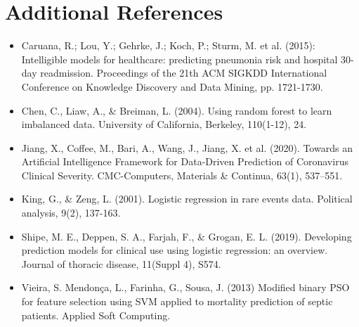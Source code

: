 \documentclass[hidelinks,10pt]{article}
\begin{document}
	\section{Additional References}\label{sec_ref}
	\begin{itemize}
		\item Caruana, R.; Lou, Y.; Gehrke, J.; Koch, P.; Sturm, M. et al. (2015): Intelligible models for healthcare: predicting pneumonia risk and hospital 30-day readmission. Proceedings of the 21th ACM SIGKDD International Conference on Knowledge Discovery and Data Mining, pp. 1721-1730.
		\item Chen, C., Liaw, A., \& Breiman, L. (2004). Using random forest to learn imbalanced data. University of California, Berkeley, 110(1-12), 24.
		\item Jiang, X., Coffee, M., Bari, A., Wang, J., Jiang, X. et al. (2020). Towards an Artificial Intelligence Framework for Data-Driven Prediction of Coronavirus Clinical Severity. CMC-Computers, Materials \& Continua, 63(1), 537–551.
			\item King, G., \& Zeng, L. (2001). Logistic regression in rare events data. Political analysis, 9(2), 137-163.
		\item Shipe, M. E., Deppen, S. A., Farjah, F., \& Grogan, E. L. (2019). Developing prediction models for clinical use using logistic regression: an overview. Journal of thoracic disease, 11(Suppl 4), S574.
		\item Vieira, S. Mendonça, L., Farinha, G., Sousa, J. (2013) Modified binary PSO for feature selection using SVM applied to mortality prediction of septic patients. Applied Soft Computing.
	
		
		
	\end{itemize}
\newpage 
\end{document}
